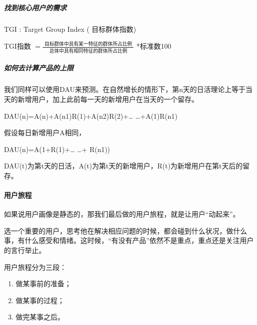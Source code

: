 \documentclass[letterpaper,11pt,english]{sphinxmanual}
\begin{document}
\subparagraph{找到核心用户的需求}
\label{\detokenize{chapter_knowledge/users_analysis:id15}}
TGI : Target Group Index ( 目标群体指数)

TGI指数
\(=\frac{\text { 目标群体中具有某一特征的群体所占比例 }}{\text { 总体中具有相同特征的群体所占比例 }}\)
*标准数100


\subparagraph{如何去计算产品的上限}
\label{\detokenize{chapter_knowledge/users_analysis:id16}}
我们同样可以使用DAU来预测。在自然增长的情形下，第n天的日活理论上等于当天的新增用户，加上此前每一天的新增用户在当天的一个留存。

DAU(n)=A(n)+A(n\sphinxhyphen{}1)R(1)+A(n\sphinxhyphen{}2)R(2)+… …+A(1)R(n\sphinxhyphen{}1)

假设每日新增用户A相同，

DAU(n)=A(1+R(1)+… …+ R(n\sphinxhyphen{}1))

DAU(t)为第t天的日活，A(t)为第t天的新增用户，R(t)为新增用户在第t天后的留存。


\paragraph{用户旅程}
\label{\detokenize{chapter_knowledge/users_analysis:id17}}
如果说用户画像是静态的，那我们最后做的用户旅程，就是让用户“动起来”。

选一个重要的用户，思考他在解决相应问题的时候，都会碰到什么状况，做什么事，有什么感受和情绪。这时候，“有没有产品”依然不是重点，重点还是关注用户的言行举止。

用户旅程分为三段：
\begin{enumerate}
%
\item {} 
做某事前的准备；

\item {} 
做某事的过程；

\item {} 
做完某事之后。

\end{enumerate}
\end{document}
